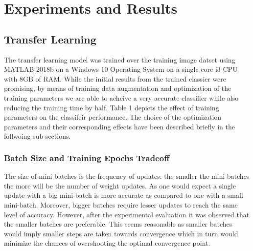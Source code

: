 \documentclass[doc/report.tex]{subfiles}
\begin{document}
\section{Experiments and Results}

\subsection{Transfer Learning}
The transfer learning model was trained over the training image datset using MATLAB 2018b on a Windows 10 Operating System on a single core i3 CPU with 8GB of RAM. While the initial results from the trained classier were promising, by means of training data augmentation and optimization of the training parameters we are able to acheive a very accurate classifier while also reducing the training time by half. Table 1 depicts the effect of training parameters on the classifeir performance. The choice of the optimization parameters and their corresponding effects have been described briefly in the follwoing sub-sections.


\begin{table}[h]
\centering
\caption{Training Parameter Analysis}
\label{tab:my-table}
\end{table}

\subsubsection{Batch Size and Training Epochs Tradeoff}
The size of mini-batches is the frequency of updates: the smaller the mini-batches the more will be the number of weight updates. As one would expect a single update with a big mini-batch is more accurate as compared to one with a small mini-batch. Moreover, bigger batches require lesser updates to reach the same level of accuracy. However, after the experimental evaluation it was observed that the smaller batches are preferable. This seems reasonable as smaller batches would imply smaller steps are taken towards convergence which in turn would minimize the chances of overshooting the optimal convergence point.
\end{document}
